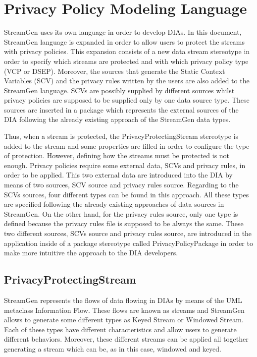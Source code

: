 \section{Privacy Policy Modeling Language}
\label{Privacy Policy Modeling Language}

StreamGen uses its own language in order to develop DIAs. In this document, StreamGen language is expanded in order to allow users to protect the streams with privacy policies. This expansion consists of a new data stream stereotype in order to specify which streams are protected and with which privacy policy type (VCP or DSEP). Moreover, the sources that generate the Static Context Variables (SCV) and the privacy rules written by the users are also added to the StreamGen language. SCVs are possibly supplied by different sources whilst privacy policies are supposed to be supplied only by one data source type. These sources are inserted in a package which represents the external sources of the DIA following the already existing approach of the StreamGen data types.

Thus, when a stream is protected, the PrivacyProtectingStream stereotype is added to the stream and some properties are filled in order to configure the type of protection. However, defining how the streams must be protected is not enough. Privacy policies require some external data, SCVs and privacy rules, in order to be applied. This two external data are introduced into the DIA by means of two sources, SCV source and privacy rules source. Regarding to the SCVs sources, four different types can be found in this approach. All these types are specified following the already existing approaches of data sources in StreamGen. On the other hand, for the privacy rules source, only one type is defined because the privacy rules file is supposed to be always the same. These two different sources, SCVs source and privacy rules source, are introduced in the application inside of a package stereotype called PrivacyPolicyPackage in order to make more intuitive the approach to the DIA developers.

\subsection{PrivacyProtectingStream}

StreamGen represents the flows of data flowing in DIAs by means of the UML metaclass Information Flow. These flows are known as streams and StreamGen allows to generate some different types as Keyed Stream or Windowed Stream. Each of these types have different characteristics and allow users to generate different behaviors. Moreover, these different streams can be applied all together generating a stream which can be, as in this case, windowed and keyed.

